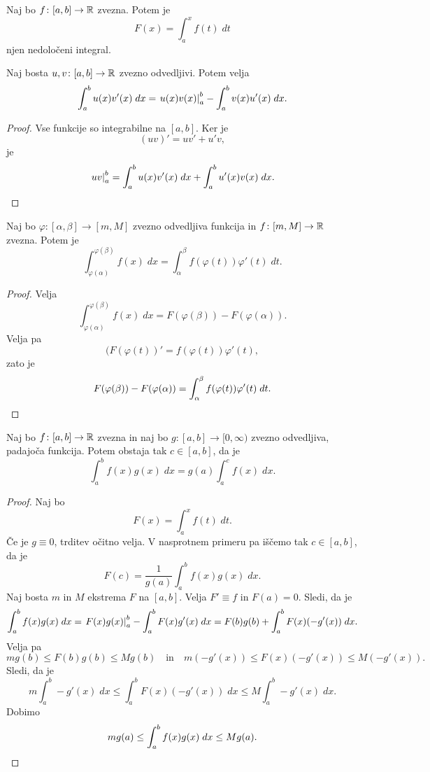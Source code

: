 \documentclass[12pt, a4paper]{article}
\begin{document}
\begin{posledica}
Naj bo $f\colon[a,b]\to\mathbb{R}$ zvezna. Potem je
\[
F(x)=\int_a^x f(t)\;dt
\]
njen nedoločeni integral.
\end{posledica}

\begin{trditev}
Naj bosta $u,v\colon[a,b]\to\mathbb{R}$ zvezno odvedljivi. Potem velja
\[
\int_a^b u(x)v'(x)\;dx=\left. u(x)v(x)\right|_{a}^{b}-\int_a^b v(x)u'(x)\;dx.
\]
\end{trditev}

\begin{proof}
Vse funkcije so integrabilne na $[a,b]$. Ker je
\[
(uv)'=uv'+u'v,
\]
je
\[
\left. uv\right|_{a}^{b}=\int_a^bu(x)v'(x)\;dx + \int_a^bu'(x)v(x)\;dx.\qedhere
\]
\end{proof}

\begin{trditev}
Naj bo $\varphi\colon[\alpha,\beta]\to[m,M]$ zvezno odvedljiva funkcija in $f\colon[m,M]\to\mathbb{R}$ zvezna. Potem je
\[
\int_{\varphi(\alpha)}^{\varphi(\beta)} f(x)\;dx = \int_\alpha^\beta f(\varphi(t))\varphi'(t)\;dt.
\]
\end{trditev}

\begin{proof}
Velja
\[
\int_{\varphi(\alpha)}^{\varphi(\beta)} f(x)\;dx =F(\varphi(\beta))-F(\varphi(\alpha)).
\]
Velja pa
\[
(F(\varphi(t))'=f(\varphi(t))\varphi'(t),
\]
zato je
\[
F(\varphi(\beta))-F(\varphi(\alpha))=\int_\alpha^\beta f(\varphi(t))\varphi'(t)\;dt.\qedhere
\]
\end{proof}

\begin{izrek}
Naj bo $f\colon[a,b]\to\mathbb{R}$ zvezna in naj bo $g\colon[a,b]\to[0,\infty)$ zvezno odvedljiva, padajoča funkcija. Potem obstaja tak $c\in[a,b]$, da je
\[
\int_a^b f(x)g(x)\;dx=g(a)\int_a^cf(x)\;dx.
\]
\end{izrek}

\begin{proof}
Naj bo
\[
F(x)=\int_a^x f(t)\;dt.
\]
Če je $g\equiv 0$, trditev očitno velja. V nasprotnem primeru pa iščemo tak $c\in[a,b]$, da je
\[
F(c)=\frac{1}{g(a)}\int_a^bf(x)g(x)\;dx.
\]
Naj bosta $m$ in $M$ ekstrema $F$ na $[a,b]$. Velja $F'\equiv f$ in $F(a)=0$. Sledi, da je
\[
\int_a^bf(x)g(x)\;dx=\left. F(x)g(x)\right|_{a}^{b}-\int_a^b F(x)g'(x)\;dx=F(b)g(b)+\int_a^b F(x)(-g'(x))\;dx.
\]
Velja pa
\[
mg(b)\leq F(b)g(b)\leq Mg(b)\quad\text{in}\quad m(-g'(x))\leq F(x)(-g'(x))\leq M(-g'(x)).
\]
Sledi, da je
\[
m\int_a^b-g'(x)\;dx\leq \int_a^b F(x)(-g'(x))\;dx\leq M\int_a^b-g'(x)\;dx.
\]
Dobimo
\[
mg(a)\leq \int_a^bf(x)g(x)\;dx\leq Mg(a).\qedhere
\]
\end{proof}
\end{document}
